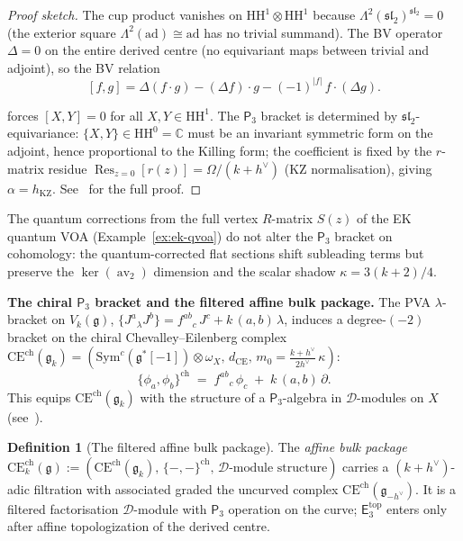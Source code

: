 \documentclass[11pt,reqno]{amsart}
\theoremstyle{definition}
\newtheorem{definition}[theorem]{Definition}
\theoremstyle{remark}
\newcommand{\cD}{\mathcal{D}}
\newcommand{\HH}{\mathrm{HH}}
\newcommand{\CE}{\mathrm{CE}}
\providecommand{\Ethree}{\mathsf{E}_{3}}
\newcommand{\Pthree}{\mathsf{P}_{3}}
\newcommand{\Sym}{\mathrm{Sym}}
\DeclareMathOperator{\av}{av}
\newcommand{\fg}{\mathfrak{g}}
\newcommand{\CC}{\mathbb{C}}
\numberwithin{equation}{section}
\begin{document}
\begin{proof}[Proof sketch]
The cup product vanishes on $\HH^1 \otimes \HH^1$ because
$\Lambda^2(\mathfrak{sl}_2)^{\mathfrak{sl}_2} = 0$
(the exterior square $\Lambda^2(\mathrm{ad}) \cong \mathrm{ad}$
has no trivial summand). The BV operator $\Delta = 0$ on the
entire derived centre (no equivariant maps between trivial
and adjoint), so the BV relation
\begin{equation}\label{eq:bv-rel-sl2}
  [f, g]
  = \Delta(f \cdot g) - (\Delta f) \cdot g
  - (-1)^{|f|}\,f \cdot (\Delta g).
\end{equation}

forces $[X, Y] = 0$ for all $X, Y \in \HH^1$.
The $\Pthree$ bracket is determined by
$\mathfrak{sl}_2$-equivariance: $\{X, Y\} \in \HH^0 = \CC$
must be an invariant symmetric form on the adjoint, hence
proportional to the Killing form; the coefficient is fixed
by the $r$-matrix residue
$\operatorname{Res}_{z=0}[r(z)] = \Omega/(k + h^\vee)$
(KZ normalisation), giving $\alpha = h_{\mathrm{KZ}}$.
See~\cite[\S IV.3]{Lorgat26I} for the full proof.
\end{proof}

The quantum corrections from the full vertex $R$-matrix
$S(z)$ of the EK quantum VOA (Example~\ref{ex:ek-qvoa})
do not alter the $\Pthree$ bracket on cohomology: the
quantum-corrected flat sections shift subleading terms but
preserve the $\ker(\av_2)$ dimension and the scalar shadow
$\kappa = 3(k{+}2)/4$.

\medskip
\noindent
\textbf{The chiral $\Pthree$ bracket and the filtered affine
bulk package.}
The PVA $\lambda$-bracket on $V_k(\fg)$,
$\{J^a \mathbin{{}_\lambda} J^b\}
= f^{ab}{}_c\, J^c + k\,(a,b)\,\lambda$,
induces a degree-$(-2)$ bracket on the chiral
Chevalley--Eilenberg complex
$\CE^{\mathrm{ch}}(\fg_k)
= (\Sym^c(\fg^*[-1]) \otimes \omega_X,\, d_{\CE},\,
m_0 = \tfrac{k + h^\vee}{2h^\vee}\,\kappa)$:
\begin{equation}\label{eq:chiral-p3-total}
  \{\phi_a, \phi_b\}^{\mathrm{ch}}
  \;=\;
  f^{ab}{}_c\,\phi_c
  \;+\;
  k\,(a,b)\,\partial.
\end{equation}
This equips $\CE^{\mathrm{ch}}(\fg_k)$ with the structure
of a $\Pthree$-algebra in $\cD$-modules on $X$
(see~\cite[\S IV.4]{Lorgat26I}).

\begin{definition}[The filtered affine bulk package]
\label{def:filtered-e3-chiral}
The \emph{affine bulk package}
$\CE^{\mathrm{ch}}_k(\fg)
:= (\CE^{\mathrm{ch}}(\fg_k),\,
\{-,-\}^{\mathrm{ch}},\,
\cD\textrm{-module structure})$
carries a $(k{+}h^\vee)$-adic filtration with associated
graded the uncurved complex
$\CE^{\mathrm{ch}}(\fg_{-h^\vee})$.
It is a filtered factorisation $\cD$-module with
$\Pthree$ operation on the curve;
$\Ethree^{\mathrm{top}}$ enters only after affine
topologization of the derived centre.
\end{definition}
\end{document}
